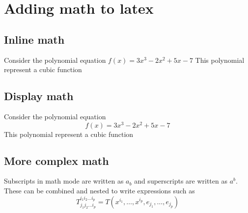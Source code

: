 \documentclass{article}
\begin{document}
	\section{Adding math to latex}
	\subsection{Inline math}
	Consider the polynomial equation $ f(x) = 3x^3 - 2x^2 + 5x - 7 $ This polynomial represent a cubic function
	
	\subsection{Display math}
	Consider the polynomial equation \[ f(x) = 3x^3 - 2x^2 + 5x - 7 \] This polynomial represent a cubic function
	
	\subsection{More complex math}
	Subscripts in math mode are written as $a_b$ and superscripts are written as $a^b$. These can be combined and nested to write expressions such as
	\[ 
		T^{i_1 i_2 \dots i_p}_{j_1 j_2 \dots i_p} = T(x^{i_1}, \dots, x^{i_p}, e_{j_1}, \dots, e_{j_p})
	 \]
	 
	 
	
	
	
\end{document}
